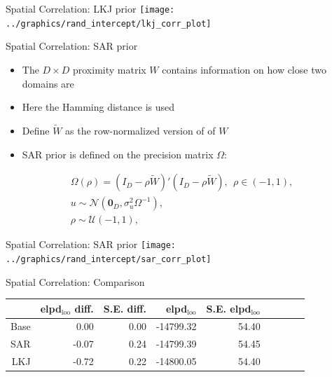 \begin{frame}{Spatial Correlation: LKJ prior}
    \vspace{-1cm}
    \centering
    \texttt{[image: ../graphics/rand\_intercept/lkj\_corr\_plot]}
\end{frame}

\begin{frame}{Spatial Correlation: SAR prior}
    \begin{itemize}
        \item The $D\times D$ proximity matrix $W$ contains information on how close two domains are
        \item Here the Hamming distance is used
        \item Define $\widetilde W$ as the row-normalized version of of $W$
        \item SAR prior is defined on the precision matrix $\Omega$:
    \end{itemize}
    \begin{gather*}
        \Omega(\rho) = (I_D - \rho \widetilde W)'(I_D - \rho \widetilde W), ~~ \rho \in (-1, 1),\\
        u \sim \mathcal N(\boldsymbol{0}_D, \sigma_u^2 \Omega^{-1}),\\
        \rho \sim \mathcal U(-1, 1),
    \end{gather*}
\end{frame}

\begin{frame}{Spatial Correlation: SAR prior}
    \vspace{-1cm}
    \centering
    \texttt{[image: ../graphics/rand\_intercept/sar\_corr\_plot]}
\end{frame}

\begin{frame}{Spatial Correlation: Comparison}
    \begin{table}[ht]
        \centering
        \begin{tabular}{rrrrrrrrr}
            \hline
            & elpd$_{\text{loo}}$ diff. & S.E. diff. & elpd$_{\text{loo}}$ & S.E. elpd$_{\text{loo}}$  \\
            \hline
            Base & 0.00 & 0.00 & -14799.32 & 54.40  \\
            SAR & -0.07 & 0.24 & -14799.39 & 54.45  \\
            LKJ & -0.72 & 0.22 & -14800.05 & 54.40  \\
            \hline
        \end{tabular}
        \label{tab:lkj_sar_base}
    \end{table}
\end{frame}

